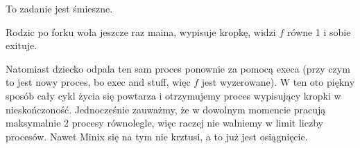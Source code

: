 To zadanie jest śmieszne.

Rodzic po forku woła jeszcze raz maina, wypisuje kropkę, widzi $f$ równe 1 i sobie exituje.

Natomiast dziecko odpala ten sam proces ponownie za pomocą execa (przy czym to jest nowy proces, bo exec and stuff, więc $f$ jest wyzerowane). W ten oto piękny sposób cały cykl życia się powtarza i otrzymujemy proces wypisujący kropki w nieskończoność. Jednocześnie zauważmy, że w dowolnym momencie pracują maksymalnie 2 procesy równolegle, więc raczej nie walniemy w limit liczby procesów. Nawet Minix się na tym nie krztusi, a to już jest osiągnięcie. 